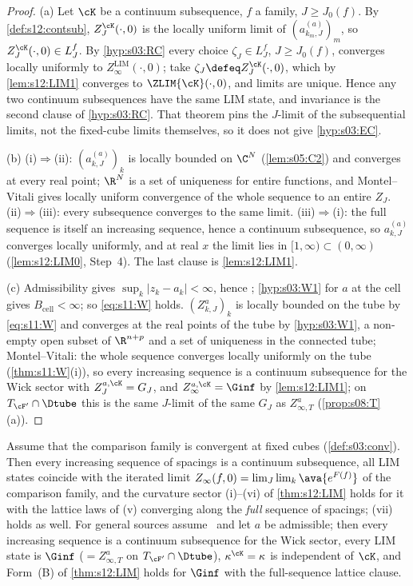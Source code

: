\begin{proof}
(a) Let $\cK$ be a continuum subsequence, $f$ a family, $J\ge J_0(f)$. By \cref{def:s12:contsub}, $Z^{\cK}_J(\cdot,0)$ is the locally uniform limit of $(a^{(a)}_{k_m,J})_m$, so $Z^{\cK}_J(\cdot,0)\in L^f_J$. By \cref{hyp:s03:RC} every choice $\zeta_J\in L^f_J$, $J\ge J_0(f)$, converges locally uniformly to $Z^{\mathrm{LIM}}_\infty(\cdot,0)$; take $\zeta_J\defeq Z^{\cK}_J(\cdot,0)$, which by \cref{lem:s12:LIM1} converges to $\ZLIM{\cK}(\cdot,0)$, and limits are unique. Hence any two continuum subsequences have the same LIM state, and invariance is the second clause of \cref{hyp:s03:RC}. That theorem pins the $J$-limit of the subsequential limits, not the fixed-cube limits themselves, so it does not give \cref{hyp:s03:EC}.

(b) (i)$\Rightarrow$(ii): $(a^{(a)}_{k,J})_k$ is locally bounded on $\C^N$ (\cref{lem:s05:C2}) and converges at every real point; $\R^N$ is a set of uniqueness for entire functions, and Montel--Vitali gives locally uniform convergence of the whole sequence to an entire $Z_J$. (ii)$\Rightarrow$(iii): every subsequence converges to the same limit. (iii)$\Rightarrow$(i): the full sequence is itself an increasing sequence, hence a continuum subsequence, so $a^{(a)}_{k,J}$ converges locally uniformly, and at real $x$ the limit lies in $[1,\infty)\subset(0,\infty)$ (\cref{lem:s12:LIM0}, Step~4). The last clause is \cref{lem:s12:LIM1}.

(c) Admissibility gives $\sup_k|z_k-a_k|<\infty$, hence \SCH; \cref{hyp:s03:W1} for $a$ at the cell gives $B_{\mathrm{cell}}<\infty$; so \eqref{eq:s11:W} holds. $(Z^a_{k,J})_k$ is locally bounded on the tube by \eqref{eq:s11:W} and converges at the real points of the tube by \cref{hyp:s03:W1}, a non-empty open subset of $\R^{n+p}$ and a set of uniqueness in the connected tube; Montel--Vitali: the whole sequence converges locally uniformly on the tube (\cref{thm:s11:W}(i)), so every increasing sequence is a continuum subsequence for the Wick sector with $Z^{a,\cK}_J=G_J$, and $Z^{a,\cK}_\infty=\Ginf$ by \cref{lem:s12:LIM1}; on $T_{\cF'}\cap\Dtube$ this is the same $J$-limit of the same $G_J$ as $Z^a_{\infty,T}$ (\cref{prop:s08:T}(a)).
\end{proof}

\begin{corollary}\label{cor:s12:K}
Assume that the comparison family is convergent at fixed cubes (\cref{def:s03:conv}). Then every increasing sequence of spacings is a continuum subsequence, all LIM states coincide with the iterated limit $Z_\infty(f,0)=\lim_J\lim_k\ava{e^{F(f)}}$ of the comparison family, and the curvature sector (i)--(vi) of \cref{thm:s12:LIM} holds for it with the lattice laws of (v) converging along the \emph{full} sequence of spacings; (vii) holds as well. For general sources assume \Tthree\ and let $a$ be admissible; then every increasing sequence is a continuum subsequence for the Wick sector, every LIM state is $\Ginf$ ($=Z^a_{\infty,T}$ on $T_{\cF'}\cap\Dtube$), $\kappa^{\cK}=\kappa$ is independent of $\cK$, and Form~(B) of \cref{thm:s12:LIM} holds for $\Ginf$ with the full-sequence lattice clause.
\end{corollary}


